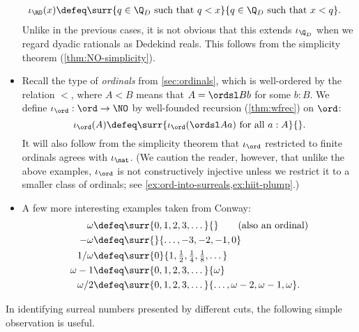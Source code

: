 \begin{itemize}
  \begin{align*}
    \iota_{\RD}(x) &\defeq
    \surr{q\in\Q_D \text{ such that } q<x}{q\in\Q_D \text{ such that } x<q}.
  \end{align*}
  Unlike in the previous cases, it is not obvious that this extends $\iota_{\Q_D}$ when we regard dyadic rationals as Dedekind reals.
  This follows from the simplicity theorem (\cref{thm:NO-simplicity}).
\item Recall the type \ord of \emph{ordinals} from \cref{sec:ordinals}, which is well-ordered by the relation $<$, where $A<B$ means that $A = \ordsl B b$ for some $b:B$.
  We define $\iota_{\ord}:\ord\to\NO$\label{ord-into-surreals} by well-founded recursion (\cref{thm:wfrec}) on $\ord$:
  \begin{equation*}
    \iota_{\ord}(A) \defeq
    \surr{\iota_\ord(\ordsl A a) \text{ for all } a:A}{}.
  \end{equation*}
  It will also follow from the simplicity theorem that $\iota_\ord$ restricted to finite ordinals agrees with $\iota_\nat$.
  (We caution the reader, however, that unlike the above examples, $\iota_\ord$ is not constructively injective unless we restrict it to a smaller class of ordinals; see \cref{ex:ord-into-surreals,ex:hiit-plump}.)
\item A few more interesting examples taken from Conway:
  \begin{align*}
    \omega &\defeq \surr{0,1,2,3,\dots}{} \qquad\text{(also an ordinal)}\\
    -\omega &\defeq \surr{}{\dots,-3,-2,-1,0}\\
    1/\omega &\defeq \textstyle\surr{0}{1,\frac12,\frac14,\frac18,\dots}\\
    \omega-1 &\defeq \surr{0,1,2,3,\dots}{\omega}\\
    \omega/2 &\defeq \surr{0,1,2,3,\dots}{\dots,\omega-2,\omega-1,\omega}.
  \end{align*}
\end{itemize}

In identifying surreal numbers presented by different cuts, the following simple observation is useful.

